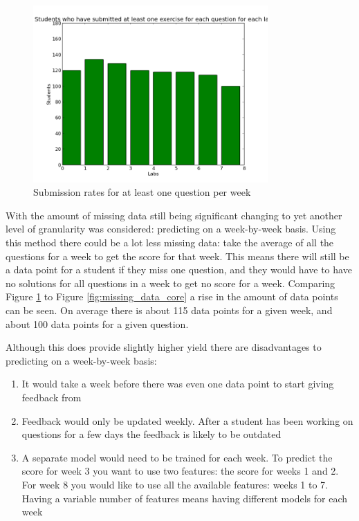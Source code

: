\begin{figure}[h!]
\centering
\includegraphics[width=0.8\textwidth]{images/missing_data_week_any.png}
\caption{Submission rates for at least one question per week}
\label{fig:missing_data_week_any}
\end{figure}

With the amount of missing data still being significant changing to yet another level of granularity was considered: predicting on a week-by-week basis. Using this method there could be a lot less missing data: take the average of all the questions for a week to get the score for that week. This means there will still be a data point for a student if they miss one question, and they would have to have no solutions for all questions in a week to get no score for a week. Comparing Figure \ref{fig:missing_data_week_any} to Figure \ref{fig:missing_data_core} a rise in the amount of data points can be seen. On average there is about 115 data points for a given week, and about 100 data points for a given question.

Although this does provide slightly higher yield there are disadvantages to predicting on a week-by-week basis:

\begin{enumerate}
\item It would take a week before there was even one data point to start giving feedback from
\item Feedback would only be updated weekly. After a student has been working on questions for a few days the feedback is likely to be outdated
\item A separate model would need to be trained for each week. To predict the score for week 3 you want to use two features: the score for weeks 1 and 2. For week 8 you would like to use all the available features: weeks 1 to 7. Having a variable number of features means having different models for each week
\end{enumerate}


